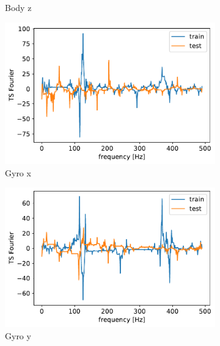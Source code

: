 \documentclass[10pt, a4paper, twocolumn]{article}
\begin{document}
\begin{figure}
\begin{subfigure}[t]{0.15\textwidth}
    \caption{Body z  }
    \label{fig:bzwal}
    \end{subfigure}

        \begin{subfigure}[t]{0.15\textwidth}
    \includegraphics[width=\linewidth]{gyro_x_WALKING.pdf}
    \caption{Gyro x  }
    \label{fig:gxwal}
    \end{subfigure}
    \hfill%
    \begin{subfigure}[t]{0.15\textwidth}
    \includegraphics[width=\linewidth]{gyro_y_WALKING.pdf}
    \caption{Gyro y  }
    \end{subfigure}
    \hfill%
    \begin{subfigure}[t]{0.15\textwidth}

\end{subfigure}
\end{figure}
\end{document}
